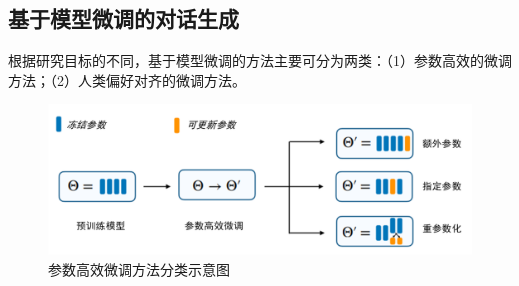 \subsection{基于模型微调的对话生成}

根据研究目标的不同，基于模型微调的方法主要可分为两类：（1）参数高效的微调方法；（2）人类偏好对齐的微调方法。

\begin{figure}[htbp]
	\centering
	\includegraphics[scale=0.65]{Fig/delta-tuning.png}
	\caption{\label{delta_tuning}参数高效微调方法分类示意图\cite{DBLP:journals/corr/abs-2203-06904}}
\end{figure}


